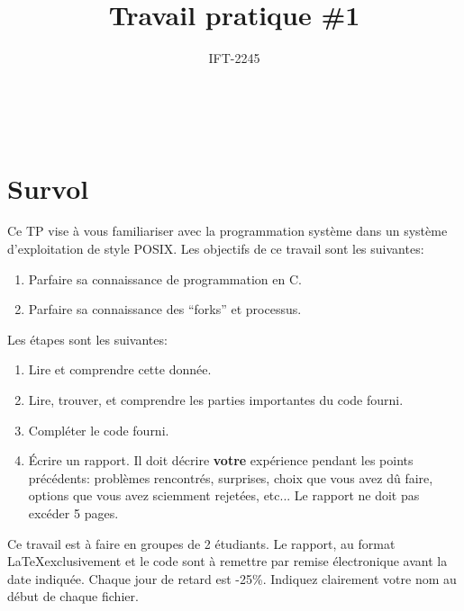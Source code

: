 \documentclass{article}
\title{Travail pratique \#1}
\author{IFT-2245}
\begin{document}
\maketitle

{\centering {} \\}

\newcommand \mML {\ensuremath\mu\textsl{ML}}
\newcommand \kw [1] {\textsf{#1}}
\newcommand \id [1] {\textsl{#1}}
\newcommand \punc [1] {\kw{`#1'}}
\newcommand \str [1] {\texttt{"#1"}}
\newenvironment{outitemize}{
  \begin{itemize}
  \let \origitem \item \def \item {\origitem[]\hspace{-18pt}}
}{
  \end{itemize}
}
\newcommand \Align [2][t] {
  \begin{array}[#1]{@{}l}
    #2
  \end{array}}

\section{Survol}

Ce TP vise à vous familiariser avec la programmation système dans un système
d'exploitation de style POSIX.
Les objectifs de ce travail sont les suivantes:
\begin{enumerate}
\item Parfaire sa connaissance de programmation en C.
\item Parfaire sa connaissance des ``forks'' et processus.
\end{enumerate}
Les étapes sont les suivantes:
\begin{enumerate}
\item Lire et comprendre cette donnée. 
\item Lire, trouver, et comprendre les parties importantes du code fourni.
\item Compléter le code fourni.
\item Écrire un rapport.  Il doit décrire \textbf{votre} expérience pendant
  les points précédents: problèmes rencontrés, surprises, choix que vous
  avez dû faire, options que vous avez sciemment rejetées, etc...  Le
  rapport ne doit pas excéder 5 pages.
\end{enumerate}

Ce travail est à faire en groupes de 2 étudiants.  Le rapport, au format
\LaTeX exclusivement et le code sont
à remettre par remise électronique avant la date indiquée.
Chaque jour de retard est -25\%.
Indiquez clairement votre nom au début de chaque fichier.
\end{document}
